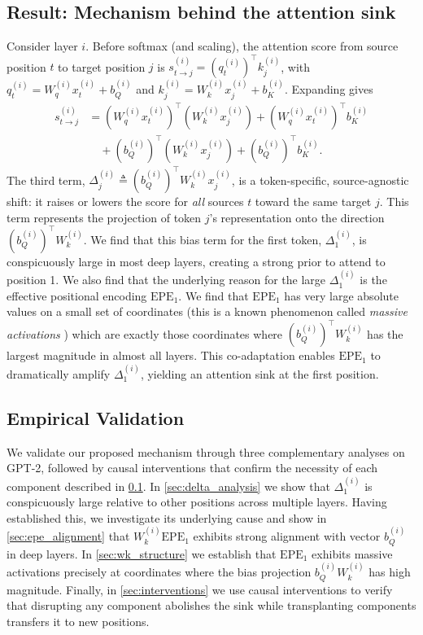 \documentclass[11pt]{article}
\newif\ifYRMcomments
\newif\ifBacklogcomments
\newcommand{\YRM}[1]{\ifYRMcomments\textcolor{red}{[YRM: #1]}\fi}
\newcommand{\Backlog}[1]{\ifBacklogcomments\textcolor{blue}{[Backlog: #1]}\fi}
\begin{document}
\subsection{Result: Mechanism behind the attention sink}\label{sec:mechanism}
Consider layer $i$. Before softmax (and scaling), the attention score from source position $t$ to target position $j$ is $s_{t\to j}^{(i)} = (q_t^{(i)})^\top k_j^{(i)}$, with $q_t^{(i)} = W_q^{(i)} x_t^{(i)} + b_Q^{(i)}$ and $k_j^{(i)} = W_k^{(i)} x_j^{(i)} + b_K^{(i)}$. Expanding gives
\[
\begin{aligned}
s_{t\to j}^{(i)} &= (W_q^{(i)} x_t^{(i)})^\top (W_k^{(i)} x_j^{(i)}) + (W_q^{(i)} x_t^{(i)})^\top b_K^{(i)} \\
&\quad + (b_Q^{(i)})^\top (W_k^{(i)} x_j^{(i)}) + (b_Q^{(i)})^\top b_K^{(i)}.
\end{aligned}
\]
The third term, $\Delta_j^{(i)} \triangleq (b_Q^{(i)})^\top W_k^{(i)} x_j^{(i)}$, is a token-specific, source-agnostic shift: it raises or lowers the score for \emph{all} sources $t$ toward the same target $j$. This term represents the projection of token $j$'s representation onto the direction $(b_Q^{(i)})^\top W_k^{(i)}$. We find that this bias term for the first token, $\Delta_1^{(i)}$, is conspicuously large in most deep layers, creating a strong prior to attend to position 1. We also find that the underlying reason for the large $\Delta_1^{(i)}$ is the effective positional encoding $\mathrm{EPE}_1$. We find that $\mathrm{EPE}_1$ has very large absolute values on a small set of coordinates (this is a known phenomenon called \textit{massive activations} \YRM{Cite}) which are exactly those coordinates where $(b_Q^{(i)})^\top W_k^{(i)}$ has the largest magnitude in almost all layers. This co-adaptation enables $\mathrm{EPE}_1$ to dramatically amplify $\Delta_1^{(i)}$, yielding an attention sink at the first position. \Backlog{Can we add a diagram to illustrate this? This sounds time consuming but really really helpful since this passage turned out to be somewhat dense. Let's wait to see how much space we have before doing this}

\subsection{Empirical Validation}
We validate our proposed mechanism through three complementary analyses on GPT-2, followed by causal interventions that confirm the necessity of each component described in \cref{sec:mechanism}. In \cref{sec:delta_analysis} we show that $\Delta_1^{(i)}$ is conspicuously large relative to other positions across multiple layers. Having established this, we investigate its underlying cause and show in \cref{sec:epe_alignment} that $W_k^{(i)}\mathrm{EPE}_1$ exhibits strong alignment with vector $b_Q^{(i)}$ in deep layers. In \cref{sec:wk_structure} we establish that $\mathrm{EPE}_1$ exhibits massive activations precisely at coordinates where the bias projection $b_Q^{(i)} W_k^{(i)}$ has high magnitude. Finally, in \cref{sec:interventions} we use causal interventions to verify that disrupting any component abolishes the sink while transplanting components transfers it to new positions.
\end{document}
